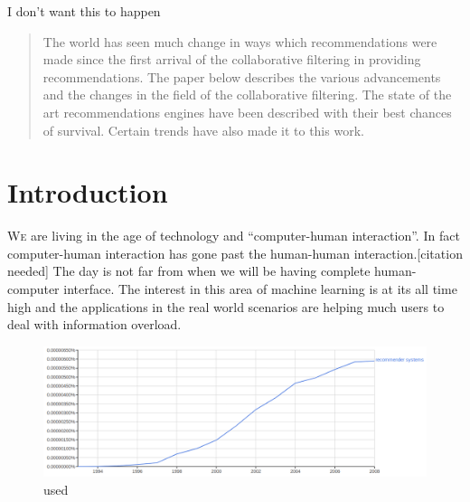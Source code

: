 \documentclass[10pt,conference]{IEEEtran}
\begin{document}
I don't want this to happen
\fi


\maketitle

\begin{abstract}
	The world has seen much change in ways which recommendations were made since the first arrival of the collaborative filtering in providing recommendations. The paper below describes the various advancements and the changes in the field of the collaborative filtering. The state of the art recommendations engines have been described with their best chances of survival. Certain trends have also made it to this work.
\end{abstract}






%
\IEEEpeerreviewmaketitle


\section{Introduction}
\lettrine[lines=2, findent=1pt, nindent=0pt]{W}e are living in the age of technology and ``computer-human interaction''. In fact computer-human interaction has gone past the human-human interaction.[citation needed] The day is not far from when we will be having complete human-computer interface.
The interest in this area of machine learning is at its all time high and the applications in the real world scenarios are helping much users to deal with information overload.


\begin{figure}
\centering
        \includegraphics[width=\textwidth]{images/history-use}
    \caption{used}
    \label{fig:verticalcell}
\end{figure}
\end{document}
